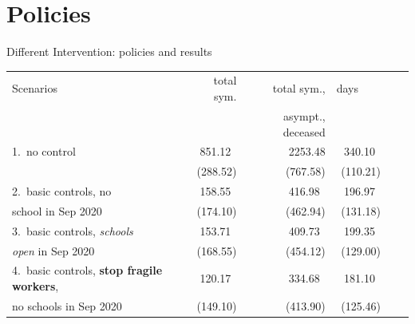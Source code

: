 \documentclass[8pt]{beamer}
\begin{document}
\section{Policies}


\begin{frame}{Different Intervention: policies and results}

\begin{table}[H]
\center
\footnotesize
\begin{tabular}{lrrrrr}
\toprule
Scenarios                              &  total sym.  & total sym.,       & days~~~~  \\
{}                                           &                    & asympt., deceased   \\                               
\midrule
1.~no control                       &  {\color{red}851.12}~     &  {\color{red}2253.48}         &  340.10~  \\
                                            &  (288.52)    &  (767.58)         &  (110.21) \\
\midrule
2.~basic controls, no           &   {\color{blue}158.55}~    &  {\color{blue}416.98}~         &  196.97~  \\
 school in Sep 2020            &   (174.10)     &  (462.94)        &  (131.18) \\
\midrule
3.~basic controls, \emph{schools}   &   {\color{blue}153.71}~    &       {\color{blue}409.73}~       &  199.35~  \\
 \emph{open} in Sep 2020                &  (168.55)   &     (454.12)        &  (129.00) \\
\midrule
4.~basic controls, \textbf{stop  fragile workers},   &   {\color{orange}120.17}~   &      {\color{orange}334.68}~         &  181.10~   \\
 no  schools in Sep 2020                          &   (149.10)  &     (413.90)         &   (125.46) \\
\midrule

\end{tabular}
\end{table}
\end{frame}
\end{document}
